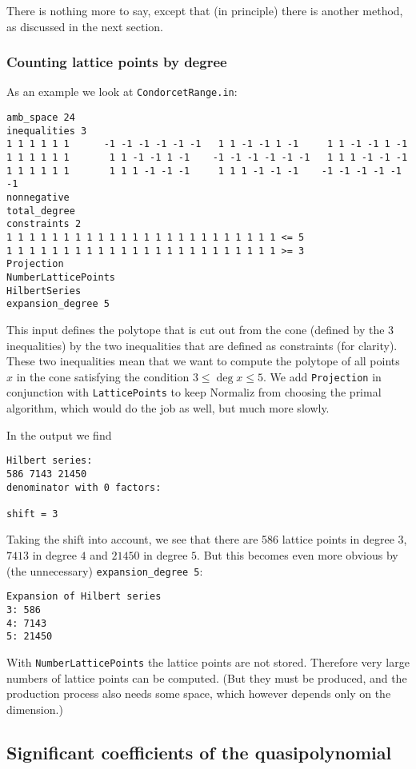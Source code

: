 \documentclass[12pt,a4paper]{scrartcl}
\theoremstyle{definition}
\begin{document}
{There is nothing more to say, except that (in principle) there is another method, as discussed in the next section.

\subsubsection{Counting lattice points by degree}\label{count}

As an example we look at \verb|CondorcetRange.in|:
\begin{Verbatim}
amb_space 24
inequalities 3
1 1 1 1 1 1      -1 -1 -1 -1 -1 -1   1 1 -1 -1 1 -1     1 1 -1 -1 1 -1
1 1 1 1 1 1       1 1 -1 -1 1 -1    -1 -1 -1 -1 -1 -1   1 1 1 -1 -1 -1
1 1 1 1 1 1       1 1 1 -1 -1 -1     1 1 1 -1 -1 -1    -1 -1 -1 -1 -1 -1
nonnegative
total_degree
constraints 2
1 1 1 1 1 1 1 1 1 1 1 1 1 1 1 1 1 1 1 1 1 1 1 1 <= 5
1 1 1 1 1 1 1 1 1 1 1 1 1 1 1 1 1 1 1 1 1 1 1 1 >= 3
Projection
NumberLatticePoints
HilbertSeries
expansion_degree 5
\end{Verbatim}
This input defines the polytope that is cut out from the cone (defined by the $3$ inequalities) by the two inequalities that are defined as constraints (for clarity). These two inequalities mean that we want to compute the polytope of all points $x$ in the cone satisfying the condition $3\le \deg x \le 5$. We add \verb|Projection| in conjunction with \verb|LatticePoints| to keep Normaliz from choosing the primal algorithm, which would do the job as well, but much more slowly.

In the output we find
\begin{Verbatim}
Hilbert series:
586 7143 21450 
denominator with 0 factors:

shift = 3
\end{Verbatim}

Taking the shift into account, we see that there are 586 lattice points in degree $3$, $7413$ in degree $4$ and $21450$ in degree $5$. But this becomes even more obvious by (the unnecessary) \verb|expansion_degree 5|:
\begin{Verbatim}
Expansion of Hilbert series
3: 586
4: 7143
5: 21450
\end{Verbatim}
With \verb|NumberLatticePoints| the lattice points are not stored. Therefore very large numbers of lattice points can be computed.  (But they must be produced, and the production process also needs some space, which however depends only on the dimension.)


\subsection{Significant coefficients of the quasipolynomial}\label{highest_coeff}

}
\end{document}
